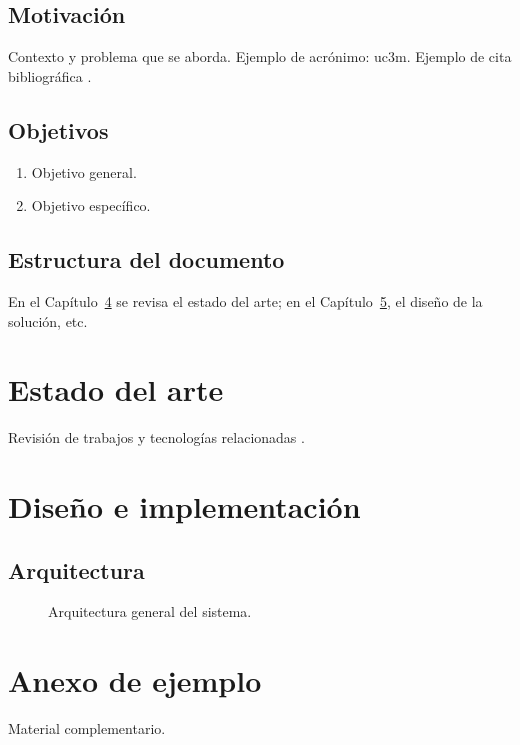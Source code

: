 \documentclass[12pt,a4paper,twoside,openright]{report}
\begin{document}
\section{Motivación}
Contexto y problema que se aborda. Ejemplo de acrónimo: \gls{uc3m}.
Ejemplo de cita bibliográfica \cite{knuth1984}.

\section{Objetivos}
\begin{enumerate}[label=\textbf{O\arabic*.}]
  \item Objetivo general.
  \item Objetivo específico.
\end{enumerate}

\section{Estructura del documento}
En el Capítulo~\ref{cap:estado} se revisa el estado del arte; en el
Capítulo~\ref{cap:diseno}, el diseño de la solución, etc.

\chapter{Estado del arte}
\label{cap:estado}
Revisión de trabajos y tecnologías relacionadas \cite{lamport1994}.

\chapter{Diseño e implementación}
\label{cap:diseno}

\section{Arquitectura}
\begin{figure}[H]
  \centering
  \caption{Arquitectura general del sistema.}
  \label{fig:arquitectura}
\end{figure}


\cleardoublepage
{}
{}
\printbibliography[title={Bibliografía}]

\appendix
\chapter{Anexo de ejemplo}
\label{anx:ejemplo}
Material complementario.
\end{document}
